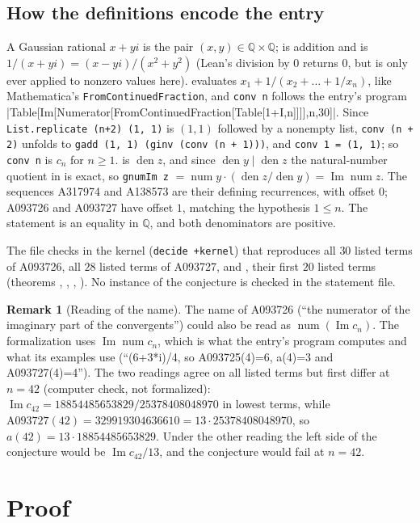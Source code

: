 \documentclass[11pt]{amsart}
\theoremstyle{plain}
\theoremstyle{definition}
\newtheorem{remark}[theorem]{Remark}
\newcommand{\li}{\lstinline[basicstyle=\ttfamily]}
\newcommand{\Q}{\mathbb{Q}}
\newcommand{\seq}[1]{\mathrm{A#1}}
\DeclareMathOperator{\im}{Im}
\DeclareMathOperator{\den}{den}
\DeclareMathOperator{\num}{num}
\begin{document}
\subsection*{How the definitions encode the entry}
A Gaussian rational $x+yi$ is the pair $(x,y)\in\Q\times\Q$;  is addition and  is $1/(x+yi)=(x-yi)/(x^2+y^2)$ (Lean's division by $0$ returns $0$, but  is only ever applied to nonzero values here).  evaluates $x_1+1/(x_2+\dots+1/x_n)$, like Mathematica's \texttt{FromContinuedFraction}, and \li|conv n| follows the entry's program \decl|Table[Im[Numerator[FromContinuedFraction[Table[1+I,{n}]]]],{n,30}]|. Since \li|List.replicate (n+2) (1, 1)| is $(1,1)$ followed by a nonempty list, \li|conv (n + 2)| unfolds to \li|gadd (1, 1) (ginv (conv (n + 1)))|, and \li|conv 1 = (1, 1)|; so \li|conv n| is $c_n$ for $n\ge1$.  is $\den z$, and since $\den y\mid\den z$ the natural-number quotient in  is exact, so \li|gnumIm z| $=\num y\cdot(\den z/\den y)=\im\num z$. The sequences A317974 and A138573 are their defining recurrences, with offset $0$; A093726 and A093727 have offset $1$, matching the hypothesis $1\le n$. The statement is an equality in $\Q$, and both denominators are positive.

The file checks in the kernel (\texttt{decide +kernel}) that  reproduces all $30$ listed terms of A093726,  all $28$ listed terms of A093727, and ,  their first $20$ listed terms (theorems , , , ). No instance of the conjecture is checked in the statement file.

\begin{remark}[Reading of the name]\label{rem:reading}
The name of A093726 (``the numerator of the imaginary part of the convergents'') could also be read as $\num(\im c_n)$. The formalization uses $\im\num c_n$, which is what the entry's program computes and what its examples use (``(6+3*i)/4, so A093725(4)=6, a(4)=3 and A093727(4)=4''). The two readings agree on all listed terms but first differ at $n=42$ (computer check, not formalized): $\im c_{42}=18854485653829/25378408048970$ in lowest terms, while $\seq{093727}(42)=329919304636610=13\cdot25378408048970$, so $a(42)=13\cdot18854485653829$. Under the other reading the left side of the conjecture would be $\im c_{42}/13$, and the conjecture would fail at $n=42$.
\end{remark}

\section{Proof}\label{sec:proof}
\end{document}
